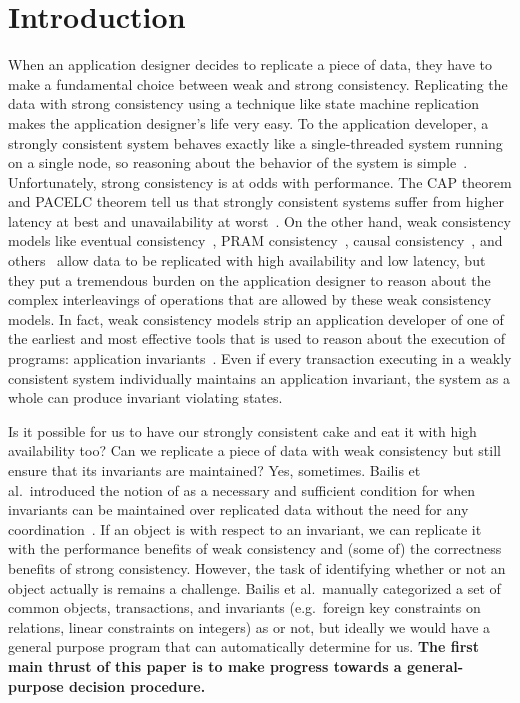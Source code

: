 \section{Introduction}
When an application designer decides to replicate a piece of data, they have to
make a fundamental choice between weak and strong consistency. Replicating the
data with strong consistency using a technique like state machine
replication~\cite{schneider1990implementing, lamport1998part,
liskov2012viewstamped, ongaro2014search, moraru2013there, vincent2015designing,
oki1988viewstamped, lamport2005generalized, lamport2006fast} makes the
application designer's life very easy. To the application developer, a strongly
consistent system behaves exactly like a single-threaded system running on a
single node, so reasoning about the behavior of the system is
simple~\cite{herlihy1990linearizability}.  Unfortunately, strong consistency is
at odds with performance. The CAP theorem and PACELC theorem tell us that
strongly consistent systems suffer from higher latency at best and
unavailability at worst~\cite{gilbert2002brewer, brewer2012cap,
abadi2012consistency}. On the other hand, weak consistency models like eventual
consistency~\cite{vogels2009eventually}, PRAM
consistency~\cite{lipton1988pram}, causal consistency~\cite{ahamad1995causal},
and others~\cite{lloyd2011don, mehdi2017can} allow data to be replicated with
high availability and low latency, but they put a tremendous burden on the
application designer to reason about the complex interleavings of operations
that are allowed by these weak consistency models. In fact, weak consistency
models strip an application developer of one of the earliest and most effective
tools that is used to reason about the execution of programs: application
invariants~\cite{hoare1969axiomatic, balegas2015towards}. Even if every
transaction executing in a weakly consistent system individually maintains an
application invariant, the system as a whole can produce invariant violating
states.

Is it possible for us to have our strongly consistent cake and eat it with high
availability too? Can we replicate a piece of data with weak consistency but
still ensure that its invariants are maintained? Yes, sometimes. Bailis et al.\
introduced the notion of \invariantconfluence{} as a necessary and sufficient
condition for when invariants can be maintained over replicated data without
the need for any coordination~\cite{bailis2014coordination}. If an object is
\invariantconfluent{} with respect to an invariant, we can replicate it with
the performance benefits of weak consistency and (some of) the correctness
benefits of strong consistency. However, the task of identifying whether or not
an object actually is \invariantconfluent{} remains a challenge. Bailis et al.\
manually categorized a set of common objects, transactions, and invariants
(e.g.\ foreign key constraints on relations, linear constraints on integers) as
\invariantconfluent{} or not, but ideally we would have a general purpose
program that can automatically determine \invariantconfluence{} for us.
\textbf{The first main thrust of this paper is to make progress towards a
general-purpose \invariantconfluence{} decision procedure.}


